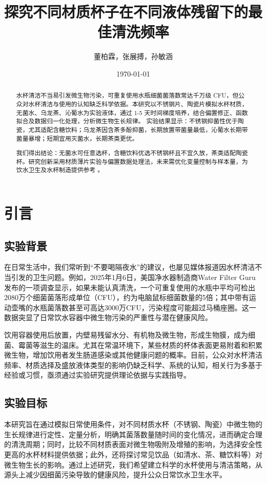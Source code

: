 \documentclass[12pt,a4paper]{ctexart}
\title{探究不同材质杯子在不同液体残留下的最佳清洗频率}
\author{董柏霖，张展搏，孙敏涵}
\date{\today}  %
\begin{document}
\maketitle  %

\begin{abstract}
水杯清洁不当易引发微生物污染，可重复使用水瓶细菌菌落数常达千万级 CFU，但公众对水杯清洁与使用的认知缺乏科学依据。本研究以不锈钢片、陶瓷片模拟水杯材质，无菌水、乌龙茶、沁葡水为实验液体，通过 1-5 天时间梯度培养，结合偏置修正、函数拟合及数据归一化处理，分析微生物生长规律。
实验结果显示：不锈钢抑菌性优于陶瓷，尤其适配含糖饮料；乌龙茶因含茶多酚抑菌，长期放置带菌量最低，沁葡水长期带菌量暴增；短期宜用灭菌水，长期茶类更优。

我们得出结论：无菌水可任意选杯，含糖饮料优选不锈钢杯且不宜久放，茶类适配陶瓷杯。研究创新采用材质薄片实验与偏置数据处理法，未来需优化变量控制与样本量，为饮水卫生及水杯制造提供参考 。
\end{abstract}
\newpage
\tableofcontents
\newpage

\section{引言}
\subsection{实验背景}

在日常生活中，我们常听到“不要喝隔夜水”的建议，也屡见媒体报道因水杯清洁不当引发的卫生问题。例如，2025年1月6日，美国净水器制造商Water Filter Guru发布的一项调查显示，如果未能认真清洗，一个可重复使用的水瓶中平均可检出2080万个细菌菌落形成单位（CFU），约为电脑鼠标细菌数量的5倍；其中带有运动壶嘴的水瓶菌落数甚至可高达3000万CFU，污染程度可能超过马桶座圈。这一数据突显了日常饮水容器中微生物污染的严重性与潜在健康风险。

饮用容器使用后放置，内壁易残留水分、有机物及微生物，形成生物膜，成为细菌、霉菌等滋生的温床。尤其在常温环境下，某些材质的杯体表面更易附着和积累微生物，增加饮用者发生肠道感染或其他健康问题的概率。目前，公众对水杯清洁频率、材质选择及盛放液体类型的影响仍缺乏科学、系统的认知，相关行为多基于经验或习惯，亟须通过实验研究提供理论依据与实践指导。

\subsection{实验目标}

本研究旨在通过模拟日常使用条件，对不同材质水杯（不锈钢、陶瓷）中微生物的生长规律进行定性、定量分析，明确其菌落数量随时间的变化情况，进而确定合理的清洗周期；同时，比较不同材质表面对微生物吸附及增殖的影响，为选择安全性更高的水杯材料提供依据；此外，还将探讨常见饮品（如清水、茶、糖饮料等）对微生物生长的影响。通过上述研究，我们希望建立科学的水杯使用与清洁策略，从源头上减少因细菌污染导致的健康风险，提升公众日常饮水卫生水平。
\end{document}
